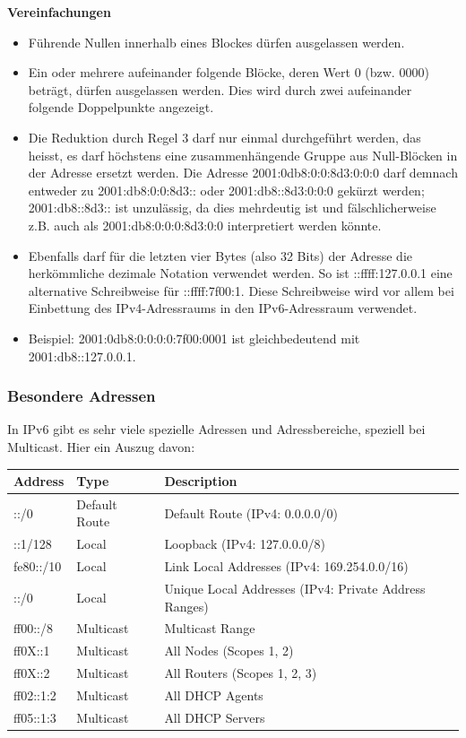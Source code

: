 \textbf{Vereinfachungen}

\begin{itemize}
	\item Führende Nullen innerhalb eines Blockes dürfen ausgelassen werden.
	\item Ein oder mehrere aufeinander folgende Blöcke, deren Wert 0 (bzw. 0000)
		beträgt, dürfen ausgelassen werden. Dies wird durch zwei aufeinander
		folgende Doppelpunkte angezeigt.
	\item Die Reduktion durch Regel 3 darf nur einmal durchgeführt werden, das
		heisst, es darf höchstens eine zusammenhängende Gruppe aus Null-Blöcken in
		der Adresse ersetzt werden. Die Adresse 2001:0db8:0:0:8d3:0:0:0 darf demnach
		entweder zu 2001:db8:0:0:8d3:: oder 2001:db8::8d3:0:0:0 gekürzt werden;
		2001:db8::8d3:: ist unzulässig, da dies mehrdeutig ist und fälschlicherweise
		z.B. auch als 2001:db8:0:0:0:8d3:0:0 interpretiert werden könnte.
	\item Ebenfalls darf für die letzten vier Bytes (also 32 Bits) der Adresse die
		herkömmliche dezimale Notation verwendet werden. So ist ::ffff:127.0.0.1
		eine alternative Schreibweise für ::ffff:7f00:1. Diese Schreibweise wird vor
		allem bei Einbettung des IPv4-Adressraums in den IPv6-Adressraum verwendet.
	\item Beispiel: 2001:0db8:0:0:0:0:7f00:0001 ist gleichbedeutend mit
		2001:db8::127.0.0.1.
\end{itemize}

\subsubsection{Besondere Adressen}

In IPv6 gibt es sehr viele spezielle Adressen und Adressbereiche, speziell bei
Multicast. Hier ein Auszug davon:

\begin{tabular}[h]{|l|l|l|}
	\hline
	\textbf{Address} & \textbf{Type} & \textbf{Description} \\
	\hline
	::/0 & Default Route & Default Route (IPv4: 0.0.0.0/0) \\
	::1/128 & Local & Loopback (IPv4: 127.0.0.0/8) \\
	fe80::/10 & Local & Link Local Addresses (IPv4: 169.254.0.0/16) \\
	::/0 & Local & Unique Local Addresses (IPv4: Private Address Ranges) \\
	ff00::/8 & Multicast & Multicast Range \\
	ff0X::1 & Multicast & All Nodes (Scopes 1, 2) \\
	ff0X::2 & Multicast & All Routers (Scopes 1, 2, 3) \\
	ff02::1:2 & Multicast & All DHCP Agents \\
	ff05::1:3 & Multicast & All DHCP Servers \\
	\hline
\end{tabular}

